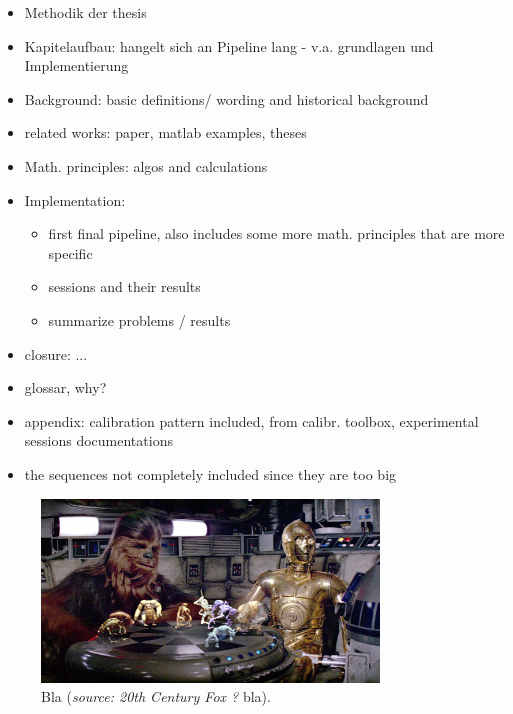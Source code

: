 
\begin{itemize}
\item Methodik der thesis
\item Kapitelaufbau: hangelt sich an Pipeline lang - v.a. grundlagen und Implementierung
\item Background: basic definitions/ wording and historical background
\item related works: paper, matlab examples, theses
\item Math. principles: algos and calculations
\item Implementation: 
	\begin{itemize}
	\item first final pipeline, also includes some more math. principles that are more specific
	\item sessions and their results
	\item summarize problems / results
	\end{itemize}
\item closure: ...
\item glossar, why?
\item appendix:  calibration pattern included, from calibr. toolbox, experimental sessions documentations
\item the sequences not completely included since they are too big
\end{itemize}


\begin{figure}[htbp]
		\centering
		\includegraphics[width=0.8\textwidth]{figures/starWars}
		\caption[Bla]{Bla (\textit{source: 20th Century Fox ?} bla).}
		\label{fig:starWars}
\end{figure}

